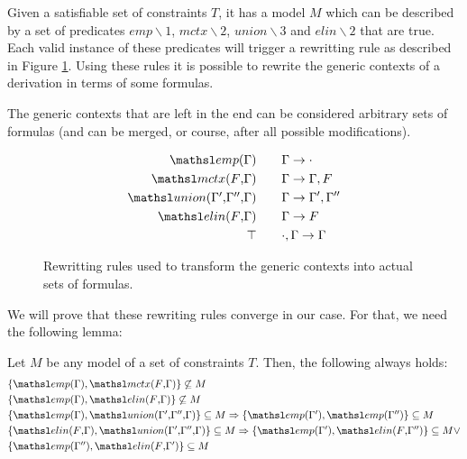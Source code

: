 Given a satisfiable set of constraints $T$, it has a model $M$ which
can be described by a set of predicates $emp \backslash 1$,
$mctx \backslash 2$, $union \backslash 3$ and $elin \backslash 2$ that are true. 
Each valid instance of these predicates will trigger a rewritting rule as
described in Figure \ref{fig:rewriting}. Using
these rules it is possible to rewrite the generic
contexts of a derivation in terms of some formulas.

The generic contexts that are left in the end can be considered arbitrary sets
of formulas (and can be merged, or course, after all possible modifications).

\begin{figure}
\begin{align*}
\emp{\Gamma} \qquad & \Gamma \rightarrow \cdot \\
\mctx{F}{\Gamma} \qquad & \Gamma \rightarrow \Gamma, F \\
\union{\Gamma'}{\Gamma''}{\Gamma} \qquad & \Gamma \rightarrow \Gamma', \Gamma'' \\
\elin{F}{\Gamma} \qquad & \Gamma \rightarrow F \\
\top \qquad & \cdot, \Gamma \rightarrow \Gamma
\end{align*}
\caption{Rewritting rules used to transform the generic contexts into actual
sets of formulas.}
\label{fig:rewriting}
\end{figure}

We will prove that these rewriting rules converge in our case. For that, we need
the following lemma:

\begin{lemma}
\label{lemma:crit_pairs}
Let $M$ be any model of a set of constraints $T$. Then, the following always
holds:
\begin{align}
&\{ \emp{\Gamma}, \mctx{F}{\Gamma} \} \not\subseteq M \label{em} \\
&\{ \emp{\Gamma}, \elin{F}{\Gamma} \} \not\subseteq M \label{ee} \\
&\{ \emp{\Gamma}, \union{\Gamma'}{\Gamma''}{\Gamma} \} \subseteq M \Rightarrow \{ 
    \emp{\Gamma'}, \emp{\Gamma''} \} \subseteq M \label{eu} \\
&\{ \elin{F}{\Gamma}, \union{\Gamma'}{\Gamma''}{\Gamma} \} \subseteq M
\Rightarrow \{ \emp{\Gamma'}, \elin{F}{\Gamma''} \} \subseteq M \vee \nonumber \\
&\{ \emp{\Gamma''}, \elin{F}{\Gamma'} \} \subseteq M \label{elun}
\end{align}
\end{lemma}


